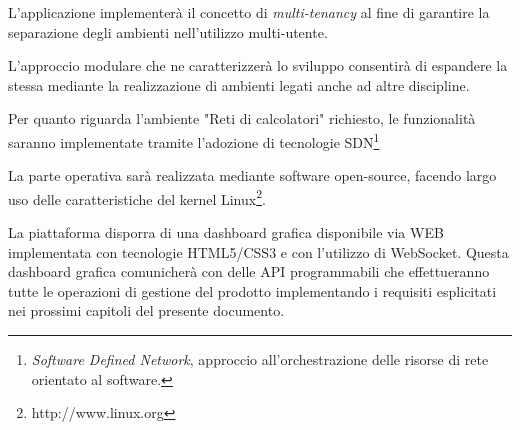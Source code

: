 \documentclass[../main.tex]{subfiles}
\begin{document}
L'applicazione implementerà il concetto di \textit{multi-tenancy} al fine di garantire la separazione degli ambienti nell'utilizzo multi-utente.

L'approccio modulare che ne caratterizzerà lo sviluppo consentirà di espandere la stessa mediante la realizzazione di ambienti legati anche ad altre discipline.

Per quanto riguarda l'ambiente "Reti di calcolatori" richiesto, le funzionalità saranno implementate tramite l'adozione di tecnologie SDN\footnote{\textit {Software Defined Network}, approccio all'orchestrazione delle risorse di rete orientato al software.}

La parte operativa sarà realizzata mediante software open-source, facendo largo uso delle caratteristiche del kernel Linux\footnote{http://www.linux.org}.

La piattaforma disporra di una dashboard grafica disponibile via WEB implementata con tecnologie HTML5/CSS3 e con l'utilizzo di WebSocket.
Questa dashboard grafica comunicherà con delle API programmabili che effettueranno tutte le operazioni di gestione del prodotto implementando i requisiti esplicitati nei prossimi capitoli del presente documento.
\end{document}
